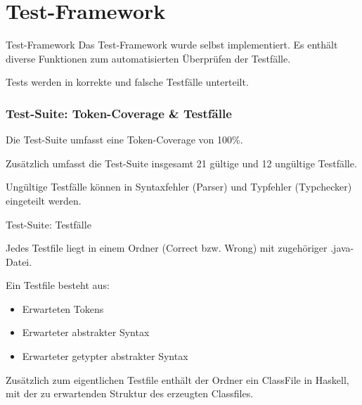 \section{Test-Framework}

\begin{frame}{Test-Framework}
Das Test-Framework wurde selbst implementiert. Es enthält diverse Funktionen zum automatisierten Überprüfen der Testfälle.

\par \medskip

\pause

Tests werden in korrekte und falsche Testfälle unterteilt.


\end{frame}

\begin{frame}[fragile]
	\frametitle{Test-Suite: Token-Coverage \& Testfälle}
	
Die Test-Suite umfasst eine Token-Coverage von 100\%. 

\pause

\par \medskip

Zusätzlich umfasst die Test-Suite insgesamt 21 gültige und 12 ungültige Testfälle.

\pause

\par \medskip

Ungültige Testfälle können in Syntaxfehler (Parser) und Typfehler (Typchecker) eingeteilt werden.
\end{frame}

\begin{frame}{Test-Suite: Testfälle}

Jedes Testfile liegt in einem Ordner (Correct bzw. Wrong) mit zugehöriger .java-Datei. 	

\pause 

\par \medskip

Ein Testfile besteht aus: 

\begin{itemize}
	\item Erwarteten Tokens \pause 
	\item Erwarteter abstrakter Syntax \pause 
	\item Erwarteter getypter abstrakter Syntax \pause
\end{itemize}

Zusätzlich zum eigentlichen Testfile enthält der Ordner ein ClassFile in Haskell, mit der zu erwartenden Struktur des erzeugten Classfiles.
\end{frame}

